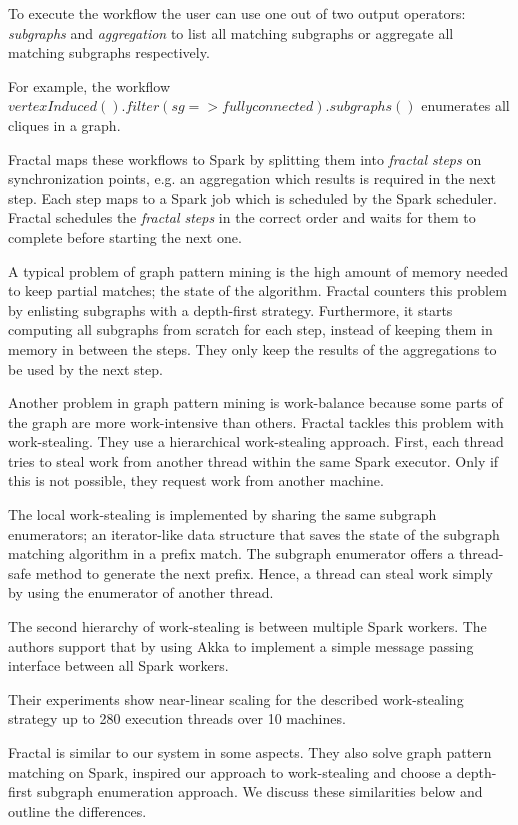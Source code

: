 To execute the workflow the user can use one out of two output operators: \textit{subgraphs} and
\textit{aggregation} to list all matching subgraphs or aggregate all matching subgraphs respectively.

For example, the workflow $vertexInduced().filter(sg => fully connected).subgraphs()$ enumerates
all cliques in a graph.

Fractal maps these workflows to Spark by splitting them into \textit{fractal steps} on
synchronization points, e.g. an aggregation which results is required in the next step.
Each step maps to a Spark job which is scheduled by the Spark scheduler.
Fractal schedules the \textit{fractal steps} in the correct order and waits for them to complete
before starting the next one.

A typical problem of graph pattern mining is the high amount of memory needed to keep partial matches;
the state of the algorithm.
Fractal counters this problem by enlisting subgraphs with a depth-first strategy.
Furthermore, it starts computing all subgraphs from scratch for each step, instead of keeping them in
memory in between the steps.
They only keep the results of the aggregations to be used by the next step.

Another problem in graph pattern mining is work-balance because some parts of the graph are
more work-intensive than others.
Fractal tackles this problem with work-stealing.
They use a hierarchical work-stealing approach.
First, each thread tries to steal work from another thread within the same Spark executor.
Only if this is not possible, they request work from another machine.

The local work-stealing is implemented by sharing the same subgraph enumerators;
an iterator-like data structure that saves the state of the subgraph matching algorithm in a prefix
match.
The subgraph enumerator offers a thread-safe method to generate the next prefix.
Hence, a thread can steal work simply by using the enumerator of another thread.

The second hierarchy of work-stealing is between multiple Spark workers.
The authors support that by using Akka to implement a simple message passing interface between
all Spark workers.

Their experiments show near-linear scaling for the described work-stealing strategy up to 280
execution threads over 10 machines.

Fractal is similar to our system in some aspects.
They also solve graph pattern matching on Spark, inspired our approach to work-stealing and
choose a depth-first subgraph enumeration approach.
We discuss these similarities below and outline the differences.

